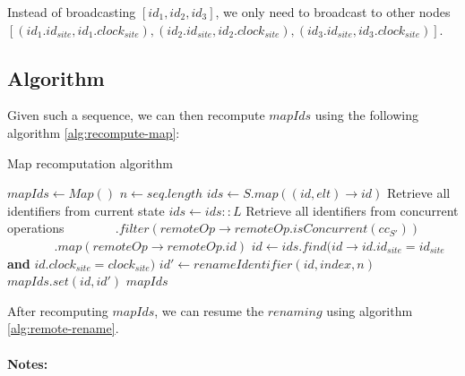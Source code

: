 \documentclass[a4paper]{article}
\begin{document}
Instead of broadcasting $[id_1, id_2, id_3]$,
we only need to broadcast to other nodes
$[(id_1.id_{site}, id_1.clock_{site}),
(id_2.id_{site}, id_2.clock_{site}),
(id_3.id_{site}, id_3.clock_{site})]$.

\subsection{Algorithm}

Given such a sequence, we can then recompute $mapIds$
using the following algorithm \ref{alg:recompute-map}:

\begin{algorithm}
  \caption{Map recomputation algorithm}
  \label{alg:recompute-map}
  \begin{algorithmic}
      \State $mapIds \gets Map()$
      \State $n \gets seq.length$
      \State $ids \gets S.map((id, elt) \to id)$
      \Comment Retrieve all identifiers from current state
      \State $ids \gets ids :: L$
      \Comment Retrieve all identifiers from concurrent operations
      \State $~~~~~~~~~~~~~~~~~.filter(remoteOp \to remoteOp.isConcurrent(cc_{S'}))$
      \State $~~~~~~~~~~~~~~~~~.map(remoteOp \to remoteOp.id)$
        \State $id \gets ids.find(id \to id.id_{site} = id_{site}$ \textbf{and} $id.clock_{site} = clock_{site})$
        \State $id' \gets renameIdentifier(id, index, n)$
        \State $mapIds.set(id, id')$
      \EndFor
      \State \Return $mapIds$
    \EndFunction
  \end{algorithmic}
\end{algorithm}

After recomputing $mapIds$, we can resume the $renaming$ using algorithm \ref{alg:remote-rename}.

\paragraph{Notes:}~\\
\end{document}
